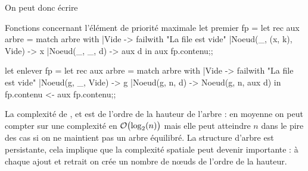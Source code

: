 \begin{figure*}
\centering
{}
\caption{Élément de priorité maximale}
\end{figure*}
On peut donc écrire
\begin{code}{Fonctions concernant l'élément de priorité maximale}
let premier fp = 
   let rec aux arbre = 
      match arbre with
      |Vide -> failwith "La file est vide"
      |Noeud(_, (x, k), Vide) -> x
      |Noeud(_, _, d) -> aux d in
   aux fp.contenu;;

let enlever fp =
   let rec aux arbre = 
      match arbre with
      |Vide -> failwith "La file est vide"
      |Noeud(g, _, Vide) -> g
      |Noeud(g, n, d) -> Noeud(g, n, aux d) in
   fp.contenu <- aux fp.contenu;; 
\end{code}
La complexité de ,  et  est de l'ordre de la hauteur de l'arbre : en moyenne on peut compter sur une complexité en ${\cal O}\bigl(\log_2(n)\bigr)$ mais elle peut atteindre $n$ dans le pire des cas si on ne maintient pas un arbre équilibré.
La structure d'arbre est persistante, cela implique que la complexité spatiale peut devenir importante : à chaque ajout et retrait on crée un nombre de nœuds de l'ordre de la hauteur.

\medskip

